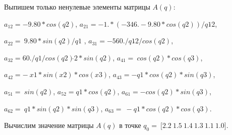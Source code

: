 Выпишем только ненулевые элементы матрицы \(A(q)\):

\(a_{12} = - 9.80*cos(q2)\),
\(a_{21} = - 1.*( - 346. - 9.80*cos(q2))/q1\hat{}2\),

\(a_{22} = \ 9.80*sin(q2)/q1\) , \(a_{31} = - 560./q1\hat{}2/cos(q2)\),

\(a_{32} = 60./q1/cos(q2)\hat{}2*sin(q2)\),
\(a_{41} = \ cos(q2)*cos(q3)\),

\(a_{42} = - \ x1*sin(x2)*cos(x3)\), \(a_{43} = - q1*cos(q2)*sin(q3)\),

\(a_{51} = \ sin(q2)\), \(a_{52} = q1*cos(q2)\),
\(a_{61} = - cos(q2)*sin(q3)\),

\(a_{62} = \ q1*sin(q2)*sin(q3)\), \(a_{63} = \  - q1*cos(q2)*cos(q3)\).

Вычислим значение матрицы \(A(q)\) в точке
\(q_{0} = \ \lbrack 2.2\ 1.5\ 1.4\ 1.3\ 1.1\ 1.0\rbrack.\)

